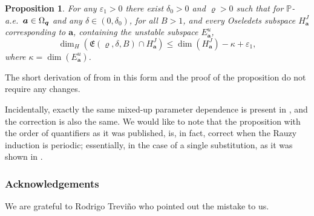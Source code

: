 \documentclass[JEP,XML,SOM,Unicode]{cedram}
\theoremstyle{plain}
\newtheorem*{prop*}{Proposition}
\let\epsilon\varepsilon
\let\Om\Omega
\newcommand\bom{{\boldsymbol a}}
\newcommand\bq{{\boldsymbol q}}
\newcommand\Fre{\mathfrak{E}}
\renewcommand{\P}{\mathbb{P}}
\begin{document}
\begin{prop*}
For any $\epsilon_1>0$ there exist $\delta_0>0$ and $\varrho>0$ such that for $\P$\nobreakdash-a.e.\ $\bom\in\nobreak \Om_\bq$ and any $\delta\in (0,\delta_0)$, for all $B>1$, and every
Oseledets subspace $H_\bom^J$ corresponding to $\bom$, containing the unstable subspace $E^u_\bom$,
\[
\dim_H(\Fre(\varrho,\delta,B)\cap H_\bom^J) \le \dim(H_\bom^J) -\kappa + \epsilon_1,
\]
where $\kappa=\dim(E^u_\bom)$.
\end{prop*}

The short derivation of \cite[Th.\,4.1]{BuSo21} from \cite[Prop.\,5.4]{BuSo21} in this form and the proof of the proposition do not require any changes. 

Incidentally, exactly the same mixed-up parameter dependence is present in \hbox{\cite[Prop.\,9.1]{BuSo18a}}, and the correction is also the same.
We would like to note that the proposition with the order of quantifiers as it was published, is, in fact, correct when the Rauzy induction is periodic; essentially, in the case of a single substitution, as it was shown in \cite{BuSol2}.

\subsubsection*{Acknowledgements}
We are grateful to Rodrigo Trevi\~no who pointed out the mistake to us.

\backmatter


\end{document}
